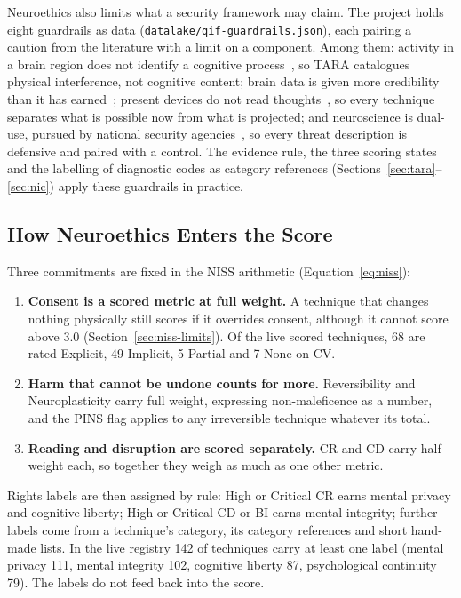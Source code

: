 Neuroethics also limits what a security framework may claim. The project holds eight
guardrails as data (\texttt{datalake/qif-guardrails.json}), each pairing a caution from the
literature with a limit on a component. Among them: activity in a brain region does not
identify a cognitive process~\cite{poldrack2006neuroimaging}, so TARA catalogues physical
interference, not cognitive content; brain data is given more credibility than it has
earned~\cite{racine2005neuroethics}; present devices do not read
thoughts~\cite{ienca2018brainleaks,wexler2019neurohype}, so every technique separates what
is possible now from what is projected; and neuroscience is dual-use, pursued by national
security agencies~\cite{tennison2012neurorights}, so every threat description is defensive
and paired with a control. The evidence rule, the three scoring states and the labelling of
diagnostic codes as category references (Sections~\ref{sec:tara}--\ref{sec:nic}) apply
these guardrails in practice.

\subsection{How Neuroethics Enters the Score}

Three commitments are fixed in the NISS arithmetic (Equation~\ref{eq:niss}):

\begin{enumerate}
  \item \textbf{Consent is a scored metric at full weight.} A technique that changes
        nothing physically still scores if it overrides consent, although it cannot
        score above 3.0 (Section~\ref{sec:niss-limits}). Of the \LiveNissScored{} live
        scored techniques, 68 are rated Explicit, 49 Implicit, 5 Partial and 7 None on CV.
  \item \textbf{Harm that cannot be undone counts for more.} Reversibility and
        Neuroplasticity carry full weight, expressing non-maleficence as a number, and the
        PINS flag applies to any irreversible technique whatever its total.
  \item \textbf{Reading and disruption are scored separately.} CR and CD carry half weight
        each, so together they weigh as much as one other metric.
\end{enumerate}

\noindent Rights labels are then assigned by rule: High or Critical CR earns mental privacy
and cognitive liberty; High or Critical CD or BI earns mental integrity; further labels come
from a technique's category, its category references and short hand-made lists. In the live
registry 142 of \LiveTechniques{} techniques carry at least one label (mental privacy 111,
mental integrity 102, cognitive liberty 87, psychological continuity 79). The labels do not
feed back into the score.

